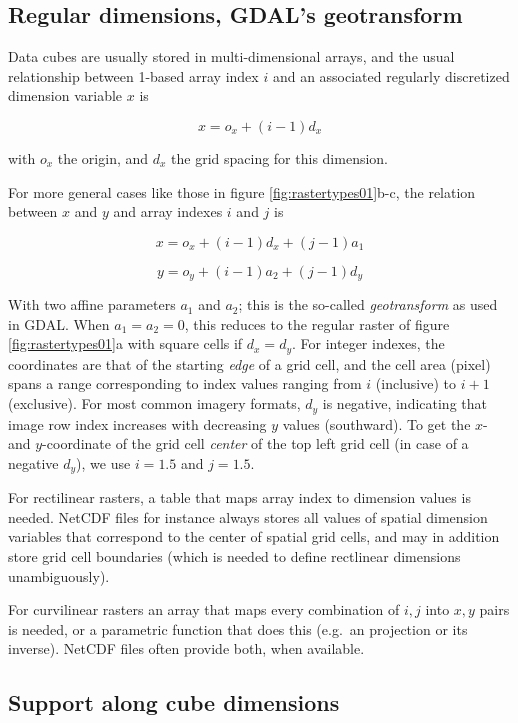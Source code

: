 \documentclass[]{book}
\begin{document}
\hypertarget{regular-dimensions-gdals-geotransform}{%
\subsection{Regular dimensions, GDAL's geotransform}\label{regular-dimensions-gdals-geotransform}}

Data cubes are usually stored in multi-dimensional arrays, and the
usual relationship between 1-based array index \(i\) and an associated
regularly discretized dimension variable \(x\) is

\[x = o_x + (i-1) d_x\]

with \(o_x\) the origin, and \(d_x\) the grid spacing for this dimension.

For more general cases like those in figure
\ref{fig:rastertypes01}b-c, the relation between \(x\) and \(y\)
and array indexes \(i\) and \(j\) is

\[x = o_x + (i-1) d_x + (j-1) a_1\]

\[y = o_y + (i-1) a_2 + (j-1) d_y\]

With two affine parameters \(a_1\) and \(a_2\); this is the so-called
\emph{geotransform} as used in GDAL. When \(a_1=a_2=0\), this
reduces to the regular raster of figure \ref{fig:rastertypes01}a
with square cells if \(d_x = d_y\).
For integer indexes, the coordinates are that of the starting \emph{edge}
of a grid cell, and the cell area (pixel) spans a range corresponding to
index values ranging from \(i\) (inclusive) to \(i+1\) (exclusive).
For most common imagery formats, \(d_y\) is negative,
indicating that image row index increases with decreasing \(y\)
values (southward). To get the \(x\)- and \(y\)-coordinate of the grid
cell \emph{center} of the top left grid cell (in case of a negative \(d_y\)),
we use \(i=1.5\) and \(j=1.5\).

For rectilinear rasters, a table that maps array index to dimension
values is needed. NetCDF files for instance always stores all values
of spatial dimension variables that correspond to the center of
spatial grid cells, and may in addition store grid cell boundaries
(which is needed to define rectlinear dimensions unambiguously).

For curvilinear rasters an array that maps every combination of \(i,j\)
into \(x,y\) pairs is needed, or a parametric function that does this
(e.g.~an projection or its inverse). NetCDF files often provide both,
when available.

\hypertarget{support-along-cube-dimensions}{%
\subsection{Support along cube dimensions}\label{support-along-cube-dimensions}}
\end{document}
